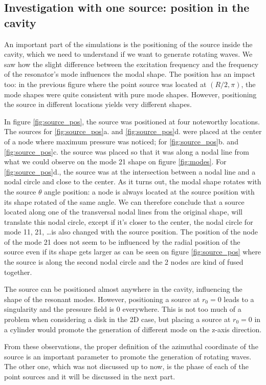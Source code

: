 \documentclass[%
 reprint,
 amsmath,amssymb,
 aps,
]{revtex4-2}
\begin{document}
\subsection{Investigation with one source: position in the cavity}
An important part of the simulations is the positioning of the source inside the cavity, which we need to understand if we want to generate rotating waves. We saw how the slight difference between the excitation frequency and the frequency of the resonator's mode influences the modal shape. The position has an impact too: in the previous figure where the point source was located at $(R/2, \pi)$, the mode shapes were quite consistent with pure mode shapes. However, positioning the source in different locations yields very different shapes.

In figure \ref{fig:source_pos}, the source was positioned at four noteworthy locations. The sources for \ref{fig:source_pos}a. and \ref{fig:source_pos}d. were placed at the center of a node where maximum pressure was noticed; for \ref{fig:source_pos}b. and \ref{fig:source_pos}c. the source was placed so that it was along a nodal line from what we could observe on the mode 21 shape on figure \ref{fig:modes}. For \ref{fig:source_pos}d., the source was at the intersection between a nodal line and a nodal circle and close to the center. As it turns out, the modal shape rotates with the source $\theta$ angle position: a node is always located at the source position with its shape rotated of the same angle. We can therefore conclude that a source located along one of the transversal nodal lines from the original shape, will translate this nodal circle, except if it's closer to the center, the nodal circle for mode 11, 21, \ldots is also changed with the source position. The position of the node of the mode 21 does not seem to be influenced by the radial position of the source even if its shape gets larger as can be seen on figure \ref{fig:source_pos} where the source is along the second nodal circle and the 2 nodes are kind of fused together.

The source can be positioned almost anywhere in the cavity, influencing the shape of the resonant modes. However, positioning a source at $r_0 = 0$ leads to a singularity and the pressure field is 0 everywhere. This is not too much of a problem when considering a disk in the 2D case, but placing a source at $r_0 = 0$ in a cylinder would promote the generation of different mode on the z-axis direction.  

From these observations, the proper definition of the azimuthal coordinate of the source is an important parameter to promote the generation of rotating waves. The other one, which was not discussed up to now, is the phase of each of the point sources and it will be discussed in the next part.
\end{document}
